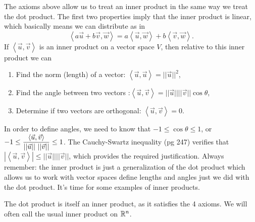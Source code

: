 The axioms above allow us to treat an inner product in the same way we treat the dot product.  The first two properties imply that the inner product is linear, which basically means we can distribute as in 
$$\left<a\vec u +b\vec v,\vec w\right> = a\left<\vec u,\vec w\right> +b\left<\vec v,\vec w\right>.$$  
If $\left<\vec u,\vec v\right>$ is an inner product on a vector space $V$, then relative to this inner product we can
\begin{enumerate}
	\item 
	Find the norm (length) of a vector: $\left<\vec u , \vec u\right>=||\vec u ||^2$,
	\item Find the angle between two vectors :$\left<\vec u , \vec v\right>= ||\vec u|| ||\vec v||\cos \theta$,
	\item Determine if two vectors are orthogonal: $\left<\vec u , \vec v\right> = 0$.
\end{enumerate}
In order to define angles, we need to know that $-1\leq \cos\theta \leq 1$, or $\displaystyle -1\leq \dfrac{\left<\vec u,\vec v\right>}{||\vec u||\ ||\vec v||}\leq 1$.  The Cauchy-Swartz inequality (pg 247) verifies that $|\left<\vec u , \vec v\right>|\leq ||\vec u|| ||\vec v||$, which provides the required justification. 
Always remember: the inner product is just a generalization of the dot product which allows us to work with vector spaces  define lengths and angles just we did with the dot product. It's time for some examples of inner products.

\begin{example}
The dot product is itself an inner product, as it satisfies the 4 axioms. We will often call the usual inner product on $\mathbb{R}^n$.
\end{example}


